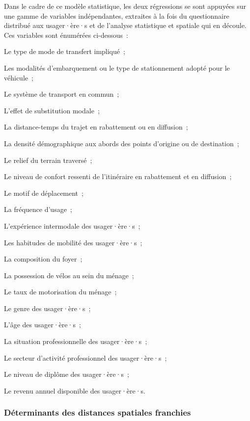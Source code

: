 \begin{refsegment}
Dans le cadre de ce modèle statistique, les deux régressions se sont appuyées sur une gamme de variables indépendantes, extraites à la fois du questionnaire distribué aux usager·ère·s et de l'analyse statistique et spatiale qui en découle. Ces variables sont énumérées ci-dessous~:
\begin{customitemize}
    \item Le type de mode de transfert impliqué~;
    \item Les modalités d'embarquement ou le type de stationnement adopté pour le véhicule~;
    \item Le système de transport en commun~;
    \item L'effet de substitution modale~;
    \item La distance-temps du trajet en rabattement ou en diffusion~;
    \item La densité démographique aux abords des points d'origine ou de destination~;
    \item Le relief du terrain traversé~;
    \item Le niveau de confort ressenti de l'itinéraire en rabattement et en diffusion~;
    \item Le motif de déplacement~;
    \item La fréquence d'usage~;
    \item L'expérience intermodale des usager·ère·s~;
    \item Les habitudes de mobilité des usager·ère·s~;
    \item La composition du foyer~;
    \item La possession de vélos au sein du ménage~;
    \item Le taux de motorisation du ménage~;
    \item Le genre des usager·ère·s~;
    \item L'âge des usager·ère·s~;
    \item La situation professionnelle des usager·ère·s~;
    \item Le secteur d'activité professionnel des usager·ère·s~;
    \item Le niveau de diplôme des usager·ère·s~;
    \item Le revenu annuel disponible des usager·ère·s.
\end{customitemize}%

\subsubsection*{Déterminants des distances spatiales franchies
    \label{chap5:facteurs-modeles-OLS-log-log}
    }


\end{refsegment}
